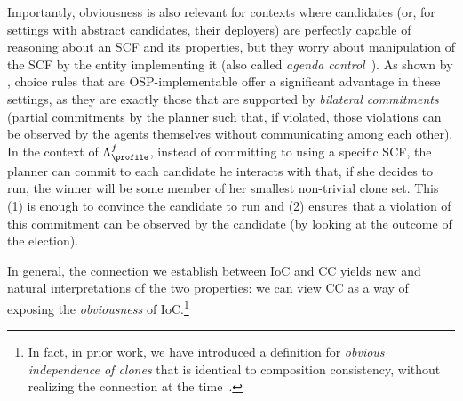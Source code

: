 Importantly, obviousness is also relevant for contexts where candidates (or, for settings with abstract candidates, their deployers) are perfectly capable of reasoning about an SCF and its properties, but they worry about manipulation of the SCF by the entity implementing it (also called \emph{agenda control}~\citep{Lang13:New}). As shown by \citet{Li17:Obviously}, choice rules that are OSP-implementable offer a significant advantage in these settings, as they are exactly those that are supported by \emph{bilateral commitments} (partial commitments by the planner such that, if violated, those violations can be observed by the agents themselves without communicating among each other). In the context of $\Lambda^f_{\profile}$, instead of committing to using a specific SCF, the planner can commit to each candidate he interacts with that, if she decides to run, the winner will be some member of her smallest non-trivial clone set. This (1) is enough to convince the candidate to run and (2) ensures that a violation of this commitment can be observed by the candidate (by looking at the outcome of the election).

In general, the connection we establish between IoC and CC yields new and natural interpretations of the two properties: we can view CC as a way of exposing the \emph{obviousness} of IoC.\footnote{In fact, in prior work, we have introduced a definition for \emph{obvious independence of clones} that is identical to composition consistency, without realizing the connection at the time~\citep{Berker22:Obvious}.}



